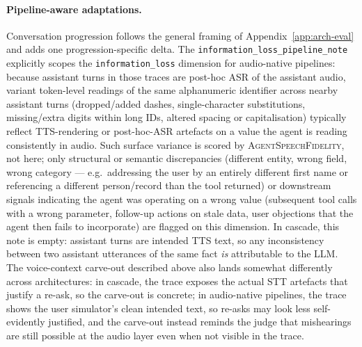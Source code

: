 \paragraph{Pipeline-aware adaptations.} Conversation progression follows the general framing of Appendix~\ref{app:arch-eval} and adds one progression-specific delta. The \texttt{information\_loss\_pipeline\_note} explicitly scopes the \texttt{information\_loss} dimension for audio-native pipelines: because assistant turns in those traces are post-hoc ASR of the assistant audio, variant token-level readings of the same alphanumeric identifier across nearby assistant turns (dropped/added dashes, single-character substitutions, missing/extra digits within long IDs, altered spacing or capitalisation) typically reflect TTS-rendering or post-hoc-ASR artefacts on a value the agent is reading consistently in audio. Such surface variance is scored by \textsc{AgentSpeechFidelity}, not here; only structural or semantic discrepancies (different entity, wrong field, wrong category --- e.g.\ addressing the user by an entirely different first name or referencing a different person/record than the tool returned) or downstream signals indicating the agent was operating on a wrong value (subsequent tool calls with a wrong parameter, follow-up actions on stale data, user objections that the agent then fails to incorporate) are flagged on this dimension. In cascade, this note is empty: assistant turns are intended TTS text, so any inconsistency between two assistant utterances of the same fact \emph{is} attributable to the LLM. The voice-context carve-out described above also lands somewhat differently across architectures: in cascade, the trace exposes the actual STT artefacts that justify a re-ask, so the carve-out is concrete; in audio-native pipelines, the trace shows the user simulator's clean intended text, so re-asks may look less self-evidently justified, and the carve-out instead reminds the judge that mishearings are still possible at the audio layer even when not visible in the trace.

